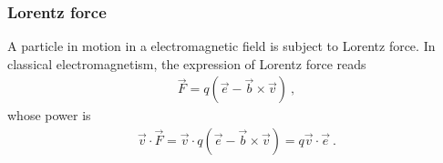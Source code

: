 \documentclass[letterpaper,10pt,english]{jupyterBook}
\begin{document}
\subsubsection{Lorentz force}
\label{\detokenize{ch/relativity-special/notes:lorentz-force}}
\sphinxAtStartPar
A particle in motion in a electromagnetic field is subject to Lorentz force. In classical electromagnetism, the expression of Lorentz force reads
\begin{equation*}
\begin{split}\vec{F} = q \left( \vec{e} - \vec{b} \times \vec{v} \right) \ ,\end{split}
\end{equation*}
\sphinxAtStartPar
whose power is
\begin{equation*}
\begin{split}\vec{v} \cdot \vec{F} = \vec{v} \cdot q \left( \vec{e} - \vec{b} \times \vec{v} \right) = q \vec{v} \cdot \vec{e} \ . \end{split}
\end{equation*}
\end{document}
